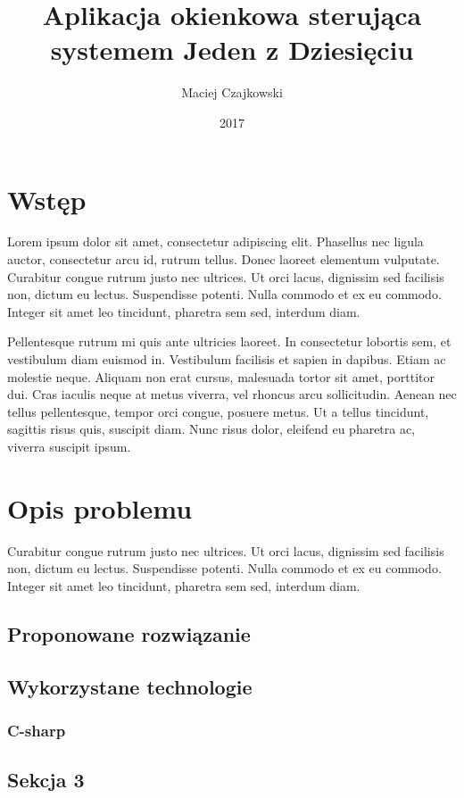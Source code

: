 \documentclass[wmii,inf,mgr]{uwmthesis}
\date{2017}
\title{Aplikacja okienkowa sterująca systemem Jeden z Dziesięciu}
\author{Maciej Czajkowski}
\begin{document}
	
\maketitle
	
\tableofcontents

\chapter*{Wstęp}
Lorem ipsum dolor sit amet, consectetur adipiscing elit. Phasellus nec ligula auctor, consectetur arcu id, rutrum tellus. Donec laoreet elementum vulputate. Curabitur congue rutrum justo nec ultrices. Ut orci lacus, dignissim sed facilisis non, dictum eu lectus. Suspendisse potenti. Nulla commodo et ex eu commodo. Integer sit amet leo tincidunt, pharetra sem sed, interdum diam. 

Pellentesque rutrum mi quis ante ultricies laoreet. In consectetur lobortis sem, et vestibulum diam euismod in. Vestibulum facilisis et sapien in dapibus. Etiam ac molestie neque. Aliquam non erat cursus, malesuada tortor sit amet, porttitor dui. Cras iaculis neque at metus viverra, vel rhoncus arcu sollicitudin. Aenean nec tellus pellentesque, tempor orci congue, posuere metus. Ut a tellus tincidunt, sagittis risus quis, suscipit diam. Nunc risus dolor, eleifend eu pharetra ac, viverra suscipit ipsum.

\chapter{Opis problemu}
Curabitur congue rutrum justo nec ultrices. Ut orci lacus, dignissim sed facilisis non, dictum eu lectus. Suspendisse potenti. Nulla commodo et ex eu commodo. Integer sit amet leo tincidunt, pharetra sem sed, interdum diam.
\section{Proponowane rozwiązanie}
\section{Wykorzystane technologie}
\subsection{C-sharp}
\section{Sekcja 3}
\end{document}
